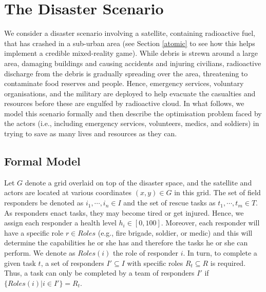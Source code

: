 \section{The Disaster Scenario}

\noindent We consider a disaster scenario involving a satellite, containing radioactive fuel, that has crashed in a sub-urban area (see Section \ref{atomic} to see how this helps implement a credible mixed-reality game). While debris is strewn around a large area, damaging buildings and causing accidents and injuring civilians, radioactive discharge from the debris is gradually spreading over the area, threatening to contaminate food reserves and people. Hence, emergency services, voluntary organisations, and the military are deployed to help evacuate the casualties and resources before these are engulfed by  radioactive cloud.  In what follows, we model this scenario formally and then describe the optimisation problem faced by the actors (i.e., including emergency services, volunteers, medics, and soldiers) in trying to save as many lives and resources as they can.

\subsection{Formal Model}
\noindent Let $G$ denote a grid overlaid on top of the disaster space, and the satellite and actors are located at various coordinates $(x,y) \in G$ in this grid. The set of field responders be denoted as $i_1, \cdots, i_n \in I$ and the set of rescue tasks as  $t_1,\cdots, t_m\in T$.  As responders enact tasks, they may become tired or get injured. Hence, we assign each responder  a health level $h_i\in [0,100]$. Moreover, each responder will have  a specific role  $r \in Roles$ (e.g., fire brigade, soldier, or medic) and this will determine the capabilities he or she has and therefore the tasks he or she can perform. We denote as $Roles(i)$ the role of responder $i$. In turn, to complete a given task $t$,  a set of responders $I' \subseteq I$ with specific roles $R_t \subseteq R$ is required. Thus, a task can only be completed by a team of responders $I'$ if $\{Roles(i) | i \in I'\} = R_t$. 

